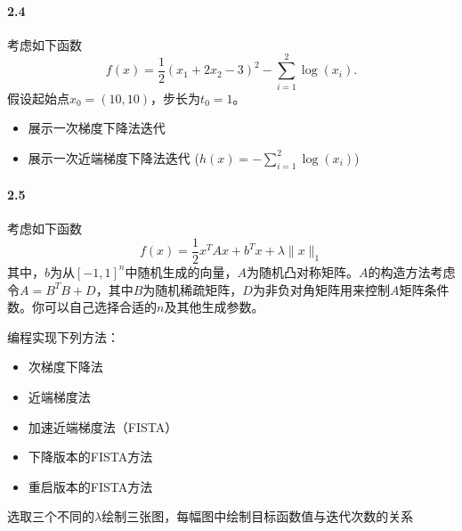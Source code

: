 \documentclass[12pt,a4paper]{article}
\begin{document}
\paragraph{2.4}
考虑如下函数 $$f(x)=\frac{1}{2}(x_1+2x_2-3)^2-\sum_{i=1}^2 \log(x_i).$$
假设起始点$x_0=(10,10)$，步长为$t_0=1$。 
\begin{itemize}
	\item 展示一次梯度下降法迭代
	\item 展示一次近端梯度下降法迭代 ($h(x)=-\sum_{i=1}^2 \log(x_i)$)
\end{itemize}

\paragraph{2.5} 考虑如下函数
$$f(x)=\frac{1}{2}x^TAx+b^Tx+\lambda \|x\|_1$$
其中，$b$为从$[-1,1]^n$中随机生成的向量，$A$为随机凸对称矩阵。$A$的构造方法考虑令$A=B^TB+D$，其中$B$为随机稀疏矩阵，$D$为非负对角矩阵用来控制$A$矩阵条件数。你可以自己选择合适的$n$及其他生成参数。

编程实现下列方法：
\begin{itemize}
	\item 次梯度下降法
	\item 近端梯度法
	\item 加速近端梯度法（FISTA）
	\item 下降版本的FISTA方法
	\item 重启版本的FISTA方法
\end{itemize}
选取三个不同的$\lambda$绘制三张图，每幅图中绘制目标函数值与迭代次数的关系
\end{document}
